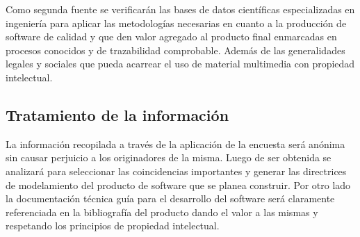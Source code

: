 Como segunda fuente se verificarán las bases de datos científicas especializadas en ingeniería para aplicar las metodologías necesarias en cuanto a la producción de software de calidad y que den valor agregado al producto final enmarcadas en procesos conocidos y de trazabilidad comprobable. Además de las generalidades legales y sociales que pueda acarrear el uso de material multimedia con propiedad intelectual. 

\subsection{Tratamiento de la información}

La información recopilada a través de la aplicación de la encuesta será anónima sin causar perjuicio a los originadores de la misma. Luego de ser obtenida se analizará para seleccionar las coincidencias importantes y generar las directrices de modelamiento del producto de software que se planea construir. 
Por otro lado la documentación técnica guía para el desarrollo del software será claramente referenciada en la bibliografía del producto dando el valor a las mismas y respetando los principios de propiedad intelectual.
